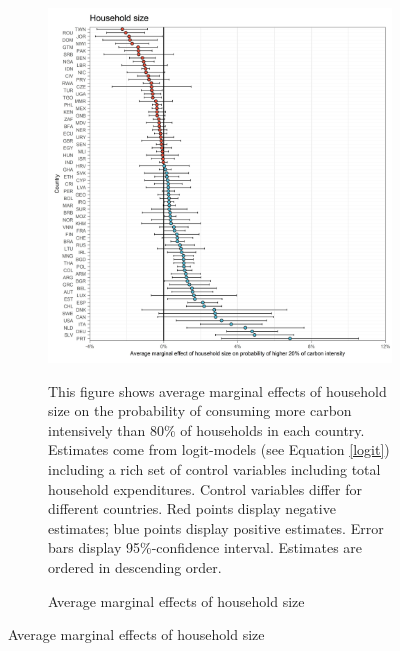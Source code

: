  \begin{figure}[ht!]\ContinuedFloat
   \centering
   \begin{subfigure}[b]{\textwidth}
   \centering
   \caption{Average marginal effects of household size} \label{fig:Logit_ME_size}
   \includegraphics{1_Figures/Analysis_Logit_Models_Marginal_Effects/Average_Marginal_Effects_affected_upper_80_hh_size_2017.jpg}
   \begin{subcaption2}
     This figure shows average marginal effects of household size on the probability of consuming more carbon intensively than 80\% of households in each country. Estimates come from logit-models (see Equation \ref{logit}) including a rich set of control variables including total household expenditures. Control variables differ for different countries. Red points display negative estimates; blue points display positive estimates. Error bars display 95\%-confidence interval. Estimates are ordered in descending order.
   \end{subcaption2}
   \end{subfigure}
 \end{figure}
 \clearpage


